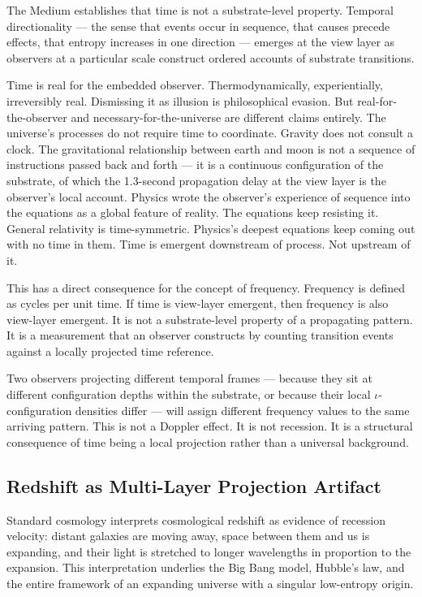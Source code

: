 \documentclass[11pt,letterpaper]{article}
\begin{document}
The Medium establishes that time is not a substrate-level property. Temporal directionality --- the sense that events occur in sequence, that causes precede effects, that entropy increases in one direction --- emerges at the view layer as observers at a particular scale construct ordered accounts of substrate transitions.

Time is real for the embedded observer. Thermodynamically, experientially, irreversibly real. Dismissing it as illusion is philosophical evasion. But real-for-the-observer and necessary-for-the-universe are different claims entirely. The universe's processes do not require time to coordinate. Gravity does not consult a clock. The gravitational relationship between earth and moon is not a sequence of instructions passed back and forth --- it is a continuous configuration of the substrate, of which the 1.3-second propagation delay at the view layer is the observer's local account. Physics wrote the observer's experience of sequence into the equations as a global feature of reality. The equations keep resisting it. General relativity is time-symmetric. Physics's deepest equations keep coming out with no time in them. Time is emergent downstream of process. Not upstream of it.

This has a direct consequence for the concept of frequency. Frequency is defined as cycles per unit time. If time is view-layer emergent, then frequency is also view-layer emergent. It is not a substrate-level property of a propagating pattern. It is a measurement that an observer constructs by counting transition events against a locally projected time reference.

Two observers projecting different temporal frames --- because they sit at different configuration depths within the substrate, or because their local \(\iota\)-configuration densities differ --- will assign different frequency values to the same arriving pattern. This is not a Doppler effect. It is not recession. It is a structural consequence of time being a local projection rather than a universal background.

\subsection{Redshift as Multi-Layer Projection Artifact}
\label{sec:orgd05cd5a}

Standard cosmology interprets cosmological redshift as evidence of recession velocity: distant galaxies are moving away, space between them and us is expanding, and their light is stretched to longer wavelengths in proportion to the expansion. This interpretation underlies the Big Bang model, Hubble's law, and the entire framework of an expanding universe with a singular low-entropy origin.
\end{document}

